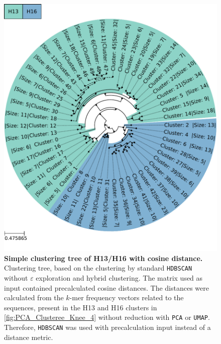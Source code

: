 \begin{figure}[!hbt]
    \centering
    \includegraphics[width=\textwidth]{PCA/Clustertree_Segment_4_H_Cosine.pdf}
    \caption[Simple clustering tree of H13/H16 with cosine distance]{\textbf{Simple clustering tree of H13/H16 with cosine distance.} Clustering tree, based on the clustering by standard \texttt{HDBSCAN} without $\varepsilon$ exploration and hybrid clustering. The matrix used as input contained precalculated cosine distances. The distances were calculated from the $k$-mer frequency vectors related to the sequences, present in the H13 and H16 clusters in \autoref{fig:PCA_Clusteree_Knee_4} without reduction with \texttt{PCA} or \texttt{UMAP}. Therefore, \texttt{HDBSCAN} was used with precalculation input instead of a distance metric.}
    \label{fig:Simple_Clustertree_Cosine}
\end{figure}

